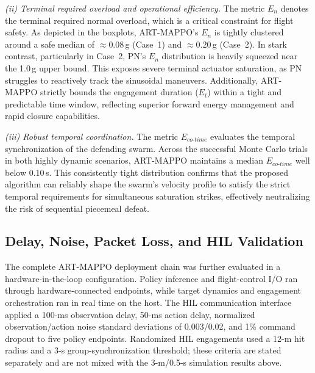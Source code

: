 \documentclass[lettersize,journal]{IEEEtran}
\providecommand{\DIFadd}[1]{{\protect\color{blue} #1}} %
\providecommand{\DIFaddbegin}{} %
\begin{document}
\emph{(ii) Terminal required overload and operational efficiency.} The metric $E_n$ denotes the terminal required normal overload, which is a critical constraint for flight safety. As depicted in the boxplots, ART-MAPPO's $E_n$ is tightly clustered around a safe median of $\approx0.08$\,g (Case~1) and $\approx0.20$\,g (Case~2). In stark contrast, particularly in Case~2, PN's $E_n$ distribution is heavily squeezed near the 1.0\,g upper bound. This exposes severe terminal actuator saturation, as PN struggles to reactively track the sinusoidal maneuvers. Additionally, ART-MAPPO strictly bounds the engagement duration ($E_t$) within a tight and predictable time window, reflecting superior forward energy management and rapid closure capabilities.

\emph{(iii) Robust temporal coordination.} The metric $E_{co\text{-}time}$ evaluates the temporal synchronization of the defending swarm. Across the successful Monte Carlo trials in both highly dynamic scenarios, ART-MAPPO maintains a median $E_{co\text{-}time}$ well below 0.10\,s. This consistently tight distribution confirms that the proposed algorithm can reliably shape the swarm's velocity profile to satisfy the strict temporal requirements for simultaneous saturation strikes, effectively neutralizing the risk of sequential piecemeal defeat.

\DIFaddbegin \subsection{\DIFadd{Delay, Noise, Packet Loss, and HIL Validation}}
\label{subsec:hil}

\DIFadd{The complete ART-MAPPO deployment chain was further evaluated in a
hardware-in-the-loop configuration. Policy inference and flight-control I/O
ran through hardware-connected endpoints, while target dynamics and engagement
orchestration ran in real time on the host. The HIL communication interface
applied a 100-ms observation delay, 50-ms action delay, normalized
observation/action noise standard deviations of 0.003/0.02, and 1\% command
dropout to five policy endpoints. Randomized HIL engagements used a 12-m hit
radius and a 3-s group-synchronization threshold; these criteria are stated
separately and are not mixed with the 3-m/0.5-s simulation results above.
}
\end{document}
